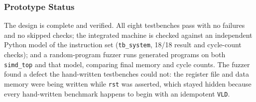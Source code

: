 \subsubsection{Prototype Status}
The design is complete and verified. All eight testbenches pass with no
failures and no skipped checks; the integrated machine is checked against an
independent Python model of the instruction set
(\texttt{tb\_system}, 18/18 result and cycle-count checks); and a random-program
fuzzer runs generated programs on both \texttt{simd\_top} and that model,
comparing final memory and cycle counts. The fuzzer found a defect the
hand-written testbenches could not: the register file and data memory were being
written while \texttt{rst} was asserted, which stayed hidden because every
hand-written benchmark happens to begin with an idempotent \texttt{VLD}.
